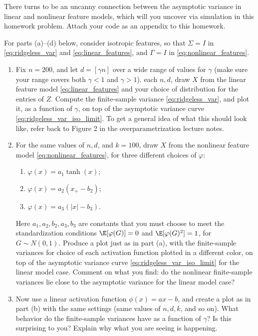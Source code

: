 \documentclass{article}
\begin{document}
There turns to be an uncanny connection between the asymptotic variance in
linear and nonlinear feature models, which will you uncover via simulation in
this homework problem. Attach your code as an appendix to this homework.  

For parts (a)--(d) below, consider isotropic features, so that $\Sigma = I$ in
\eqref{eq:ridgeless_var} and \eqref{eq:linear_features}, and $\Gamma = I$ in
\eqref{eq:nonlinear_features}.  

\begin{enumerate}[label=(\alph*)]
\item Fix $n=200$, and let $d=[\gamma n]$ over a wide range of values for
  $\gamma$ (make sure your range covers both $\gamma<1$ and $\gamma>1$). 
  each $n,d$, draw $X$ from the linear feature model \eqref{eq:linear_features}
  and your choice of distribution for the entries of $Z$. Compute the
  finite-sample variance \eqref{eq:ridgeless_var}, and plot it, as a function of
  $\gamma$, on top of the asymptotic variance curve
  \eqref{eq:ridgeless_var_iso_limit}. To get a general idea of what this should
  look like, refer back to Figure 2 in the overparametrization lecture notes.      
  \marginpar{\small [6 pts]}

\item For the same values of $n,d$, and $k=100$, draw $X$ from the nonlinear
  feature model \eqref{eq:nonlinear_features}, for three different choices of
  $\varphi$:   
  \begin{enumerate}[label=\roman*.]
  \item $\varphi(x) = a_1\tanh(x)$;
  \item $\varphi(x) = a_2(x_+-b_2)$;
  \item $\varphi(x) = a_3(|x|-b_3)$.
  \end{enumerate}
  Here $a_1,a_2,b_2,a_3,b_3$ are constants that you must choose to meet the 
  standardization conditions $\E[\varphi(G)]=0$ and $\E[\varphi(G)^2]=1$, for 
  $G \sim N(0,1)$. Produce a plot just as in part (a), with the finite-sample
  variances for choice of each activation function plotted in a different color,
  on top of the asymptotic variance curve \eqref{eq:ridgeless_var_iso_limit} for  
  the linear model case. Comment on what you find: do the nonlinear
  finite-sample variances lie close to the asymptotic variance for the linear
  model case?  
  \marginpar{\small [18 pts]}

\item Now use a linear activation function $\phi(x) = ax-b$, and create a plot
  as in part (b) with the same settings (same values of $n,d,k$, and so
  on). What behavior do the finite-sample variances have as a function of 
  $\gamma$? Is this surprising to you? Explain why what you are seeing is
  happening. 
 \marginpar{\small [6 pts]}


\end{enumerate}
\end{document}
